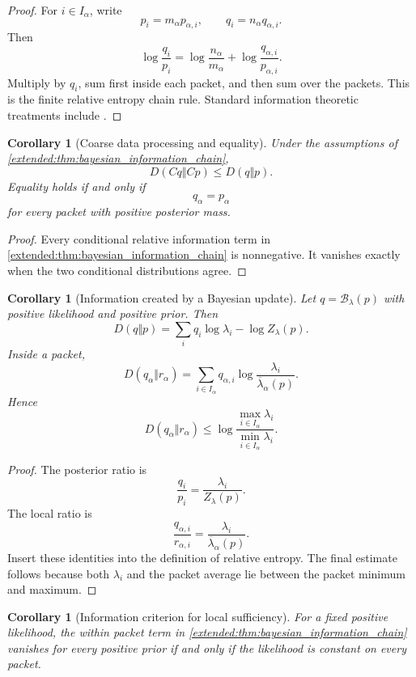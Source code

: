 \documentclass[11pt,a4paper]{article}
\newtheorem{corollary}[theorem]{Corollary}
\theoremstyle{definition}
\theoremstyle{remark}
\newcommand{\Bcal}{\mathcal B}
\begin{document}
\begin{proof}
For \(i\in I_\alpha\), write
\[
p_i=m_\alpha p_{\alpha,i},
\qquad
q_i=n_\alpha q_{\alpha,i}.
\]
Then
\[
\log\frac{q_i}{p_i}
=
\log\frac{n_\alpha}{m_\alpha}
+
\log\frac{q_{\alpha,i}}{p_{\alpha,i}}.
\]
Multiply by \(q_i\), sum first inside each packet, and then sum over the packets. This is the finite relative entropy chain rule. Standard information theoretic treatments include \cite{CoverThomas2006}.
\end{proof}

\begin{corollary}[Coarse data processing and equality]\label{extended:record:057}\label{extended:cor:coarse_data_processing}
Under the assumptions of \cref{extended:thm:bayesian_information_chain},
\[
D(Cq\Vert Cp)
\leq
D(q\Vert p).
\]
Equality holds if and only if
\[
q_\alpha=p_\alpha
\]
for every packet with positive posterior mass.
\end{corollary}

\begin{proof}
Every conditional relative information term in \cref{extended:thm:bayesian_information_chain} is nonnegative. It vanishes exactly when the two conditional distributions agree.
\end{proof}

\begin{corollary}[Information created by a Bayesian update]\label{extended:record:058}\label{extended:cor:bayesian_information_gain}
Let \(q=\Bcal_\lambda(p)\) with positive likelihood and positive prior. Then
\[
D(q\Vert p)
=
\sum_iq_i\log\lambda_i
-
\log Z_\lambda(p).
\]
Inside a packet,
\[
D(q_\alpha\Vert r_\alpha)
=
\sum_{i\in I_\alpha}
q_{\alpha,i}
\log\frac{\lambda_i}{\overline\lambda_\alpha(p)}.
\]
Hence
\[
D(q_\alpha\Vert r_\alpha)
\leq
\log
\frac{\max_{i\in I_\alpha}\lambda_i}
{\min_{i\in I_\alpha}\lambda_i}.
\]
\end{corollary}

\begin{proof}
The posterior ratio is
\[
\frac{q_i}{p_i}
=
\frac{\lambda_i}{Z_\lambda(p)}.
\]
The local ratio is
\[
\frac{q_{\alpha,i}}{r_{\alpha,i}}
=
\frac{\lambda_i}{\overline\lambda_\alpha(p)}.
\]
Insert these identities into the definition of relative entropy. The final estimate follows because both \(\lambda_i\) and the packet average lie between the packet minimum and maximum.
\end{proof}

\begin{corollary}[Information criterion for local sufficiency]\label{extended:record:059}\label{extended:cor:information_sufficiency}
For a fixed positive likelihood, the within packet term in \cref{extended:thm:bayesian_information_chain} vanishes for every positive prior if and only if the likelihood is constant on every packet.
\end{corollary}
\end{document}
